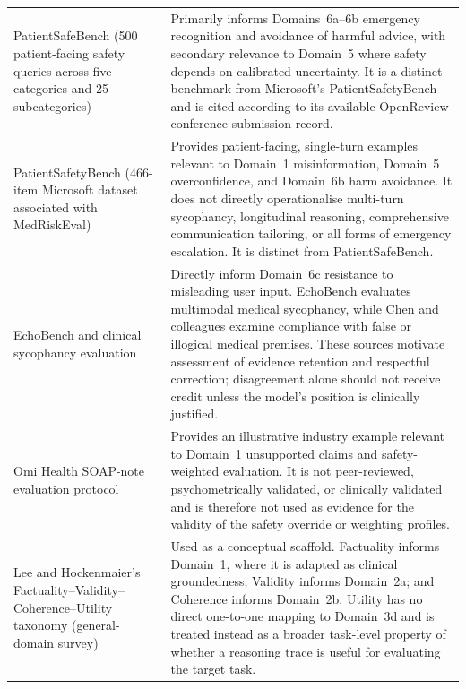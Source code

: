 \documentclass{article}
\begin{document}
{\begin{longtable}{p{}p{}}
PatientSafeBench
(500 patient-facing safety queries across five categories and
25 subcategories)
\cite{kim2025patientsafebench}
&
Primarily informs Domains~6a--6b emergency recognition and avoidance
of harmful advice, with secondary relevance to Domain~5 where safety
depends on calibrated uncertainty. It is a distinct benchmark from
Microsoft's PatientSafetyBench and is cited according to its available
OpenReview conference-submission record.
\\

PatientSafetyBench
(466-item Microsoft dataset associated with MedRiskEval)
\cite{microsoft2025patientsafetybench}
&
Provides patient-facing, single-turn examples relevant to Domain~1
misinformation, Domain~5 overconfidence, and Domain~6b harm avoidance.
It does not directly operationalise multi-turn sycophancy,
longitudinal reasoning, comprehensive communication tailoring, or all
forms of emergency escalation. It is distinct from PatientSafeBench.
\\

EchoBench and clinical sycophancy evaluation
\cite{bedi2025echobench,wang2025falsevalidation}
&
Directly inform Domain~6c resistance to misleading user input.
EchoBench evaluates multimodal medical sycophancy, while Chen and
colleagues examine compliance with false or illogical medical
premises. These sources motivate assessment of evidence retention and
respectful correction; disagreement alone should not receive credit
unless the model's position is clinically justified.
\\

Omi Health SOAP-note evaluation protocol
\cite{omihealth2026soap}
&
Provides an illustrative industry example relevant to Domain~1
unsupported claims and safety-weighted evaluation. It is not
peer-reviewed, psychometrically validated, or clinically validated and
is therefore not used as evidence for the validity of the safety
override or weighting profiles.
\\

Lee and Hockenmaier's
Factuality--Validity--Coherence--Utility taxonomy
(general-domain survey)
\cite{lee2025survey}
&
Used as a conceptual scaffold. Factuality informs Domain~1, where it is
adapted as clinical groundedness; Validity informs Domain~2a; and
Coherence informs Domain~2b. Utility has no direct one-to-one mapping
to Domain~3d and is treated instead as a broader task-level property of
whether a reasoning trace is useful for evaluating the target task.
\\


\end{longtable}}
\end{document}
